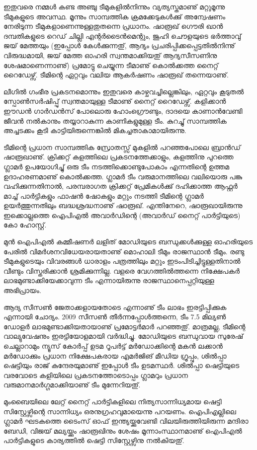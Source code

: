 ഇതുവരെ നമ്മള്‍ കണ്ട അഞ്ചു ടീമുകളില്‍നിന്നും വ്യത്യസ്തമാണു് മറ്റുമൂന്നു ടീമുകളുടെ അവസ്ഥ. മൂന്നും സാമ്പത്തിക 
ക്രമക്കേടുകള്‍ക്കു് അന്വേഷണം നേരിടുന്ന ടീമുകളാണെന്നുള്ളതുതന്നെ പ്രധാനം. ഷാരൂഖ് ഗൌരി ഖാന്‍ ദമ്പതികളുടെ റെഡ് 
ചില്ലി എന്റര്‍ടൈന്‍മെന്റും, ജൂഹി ചൌളയുടെ ഭര്‍ത്താവു് ജയ് മേത്തയും (ഇപ്പോള്‍ കേള്‍ക്കുന്നതു്, ആദ്യം പ്രചരിപ്പിക്കപ്പെട്ടതില്‍നിന്നു് 
വിരുദ്ധമായി, ജയ് മേത്ത ഓഹരി സ്വന്തമാക്കിയതു് ആദ്യസീസണിനു ശേഷമാണെന്നാണു്) പ്രമോട്ടു ചെയ്യുന്ന ടീമാണു് 
കൊല്‍ക്കത്ത നൈറ്റ് റൈഡേഴ്സ്. ടീമിന്റെ ഏറ്റവും വലിയ ആകര്‍ഷണം ഷാരൂഖ് തന്നെയാണു്.

ലീഗില്‍ ഗംഭീര പ്രകടനമൊന്നും ഇതുവരെ കാഴ്ചവച്ചില്ലെങ്കിലും, ഏറ്റവും കൂടുതല്‍ സ്പോണ്‍സര്‍ഷിപ്പു് സ്വന്തമായുള്ള ടീമാണു് 
നൈറ്റ് റൈഡേഴ്സ്. കളിക്കാന്‍ ഈഡന്‍ ഗാര്‍ഡന്‍സ് പോലൊരു ഹോംഗ്രൌണ്ടും, ദാദയെ കാണാന്‍വേണ്ടി ജീവന്‍ 
നല്‍കാനും തയ്യാറാകുന്ന കാണികളുമുള്ള ടീം. കുറച്ചു് സാമ്പത്തിക അച്ചടക്കം കൂടി കാട്ടിയിരുന്നെങ്കില്‍ മികച്ചതാകാമായിരുന്നു.

ടീമിന്റെ പ്രധാന സാമ്പത്തിക സ്രോതസ്സ് മുകളില്‍ പറഞ്ഞപോലെ ബ്രാന്‍ഡ് ഷാരൂഖാണു്. ക്രിക്കറ്റ് കളത്തിലെ 
പ്രകടനത്തേക്കാളും, കളത്തിനു പുറത്തെ ഗ്ലാമര്‍ ഉപയോഗിച്ചു് ഒരു ടീം നടത്തിക്കൊണ്ടുപോകാം എന്നതിന്റെ ഉത്തമ 
ഉദാഹരണമാണു് കൊല്‍ക്കത്ത. ഗ്ലാമര്‍ ടീം വരുമാനത്തിലെ വലിയൊരു പങ്കു വഹിക്കുന്നതിനാല്‍, പരമ്പരാഗത ക്രിക്കറ്റ് 
പ്രേമികള്‍ക്കു് ദഹിക്കാത്ത ആഫ്റ്റര്‍ മാച്ച് പാര്‍ട്ടികളും ഫാഷന്‍ ഷോകളും മറ്റും നടത്തി ടീമിന്റെ ഗ്ലാമര്‍ ഉയര്‍ത്തുന്നതിലും 
ബദ്ധശ്രദ്ധനാണു് ഷാരൂഖ്. എന്തിനേറെ, ഷാരൂഖായിരുന്നു ഇക്കൊല്ലത്തെ ഐപിഎല്‍ അവാര്‍ഡിന്റെ (അവാര്‍ഡ് 
നൈറ്റ് പാര്‍ട്ടിയുടെ) കോ ഹോസ്റ്റ്.

മുന്‍ ഐപിഎല്‍ കമ്മീഷണര്‍ ലളിത് മോഡിയുടെ ബന്ധുക്കള്‍ക്കുള്ള ഓഹരിയുടെ പേരില്‍ വിമര്‍ശനവിധേയരായതാണു് 
മൊഹാലി ടീമും രാജസ്ഥാന്‍ ടീമും. രണ്ടു ടീമുകളുടെയും വിവരങ്ങള്‍ ധാരാളം പത്രത്തിലും മറ്റും ഇടംപിടിച്ചിട്ടുള്ളതിനാല്‍ വീണ്ടും 
വിസ്തരിക്കാന്‍ ശ്രമിക്കുന്നില്ല. വളരെ വേഗത്തില്‍ത്തന്നെ നിക്ഷേപകര്‍ ലാഭമുണ്ടാക്കിയേക്കാവുന്ന ടീം എന്നായിരുന്നു 
രാജസ്ഥാനെപ്പറ്റിയുള്ള അഭിപ്രായം.

ആദ്യ സീസണ്‍ ജേതാക്കളായതോടെ എന്നാണു് ടീം ലാഭം ഇരട്ടിപ്പിക്കുക എന്നായി ചോദ്യം.  2009 സീസണ്‍ തീര്‍ന്നപ്പോള്‍ത്തന്നെ, 
ടീം 7.5 മില്യണ്‍ ഡോളര്‍ ലാഭമുണ്ടാക്കിയതായാണു് പ്രമോട്ടര്‍മാര്‍ പറഞ്ഞതു്. മാത്രമല്ല, ടീമിന്റെ വാല്യുവേഷനും ഇരട്ടിയോളമായി 
വര്‍ദ്ധിച്ചു. മോഡിയുടെ ബന്ധുവായ സുരേഷ് ചെല്ലാറാമും ന്യൂസ് കോര്‍പ്പ് ഉടമ റൂപര്‍ട്ട് മര്‍ഡോക്കിന്റെ മകന്‍ ലക്കാന്‍ 
മര്‍ഡോക്കും പ്രധാന നിക്ഷേപകരായ എമര്‍ജിങ് മീഡിയ ഗ്രൂപ്പും, ശില്‍പ്പാ ഷെട്ടിയും രാജ് കുന്ദേരയുമാണു് ഇപ്പോള്‍ ടീം 
ഉടമസ്ഥര്‍. ശില്‍പ്പാ ഷെട്ടിയുടെ വരവോടെ കളിയിലെ പ്രകടനത്തോടൊപ്പം ഗ്ലാമറും പ്രധാന വരുമാനമാര്‍ഗ്ഗമാക്കിയാണു് 
ടീം മുന്നേറിയതു്.

മുംബൈയിലെ ലേറ്റ് നൈറ്റ് പാര്‍ട്ടികളിലെ നിത്യസാന്നിധ്യമായ ഷെട്ടി സിസ്റ്റേഴ്സിന്റെ സാന്നിധ്യം ഒരനുഗ്രഹവുമായെന്നു 
പറയണം. ഐപിഎല്ലിലെ ഗ്ലാമര്‍ ഘടകത്തെ ടൈംസ് ഓഫ് ഇന്ത്യയ്ക്കുവേണ്ടി വിലയിരുത്തിയിരുന്ന മന്ദിരാ ബേഡി, 
വിജയ് മല്യയ്ക്കും ഷാരൂഖിനും ശേഷം മൂന്നാംസ്ഥാനമാണു് ഐപിഎല്‍ പാര്‍ട്ടികളുടെ കാര്യത്തില്‍ ഷെട്ടി സിസ്റ്റേഴ്സിനു 
നല്‍കിയതു്.

